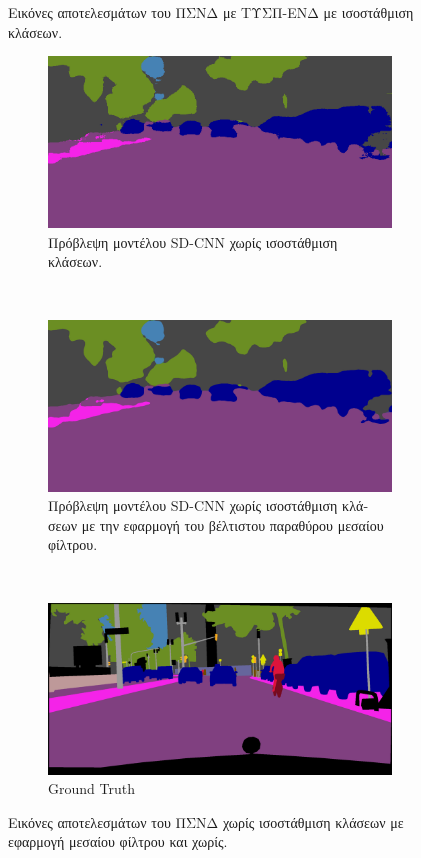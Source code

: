 \begin{figure}[H]
  \caption[\textgreek{Εικόνες από ΠΣΝΔ-ΤΥΣΠ-ΕΝΔ}]{\textgreek{Εικόνες αποτελεσμάτων του ΠΣΝΔ με ΤΥΣΠ-ΕΝΔ με ισοστάθμιση κλάσεων.}}
 \label{fig:image_results_1}
\end{figure}

\begin{figure}[H]
 \centering
 \begin{subfigure}[b]{\linewidth}
 \centering
 \includegraphics[width=0.8\linewidth]{Images/frankfurt_000000_015676_5_leftImg8bit}
  \caption{\textgreek{Πρόβλεψη μοντέλου }SD-CNN \textgreek{χωρίς ισοστάθμιση κλάσεων}.}
  \end{subfigure}
 ~
 \begin{subfigure}[b]{\linewidth}
 \centering
 \includegraphics[width=0.8\linewidth]{Images/frankfurt_000000_015676_5_median_leftImg8bit}
  \caption{\textgreek{Πρόβλεψη μοντέλου }SD-CNN \textgreek{χωρίς ισοστάθμιση κλάσεων με την εφαρμογή του βέλτιστου παραθύρου μεσαίου φίλτρου}.}
  \end{subfigure}
  ~
  \begin{subfigure}[b]{\linewidth}
  \centering
  \includegraphics[width=0.8\linewidth]{Images/frankfurt_000000_015676_gtFine_color}
  \caption{Ground Truth}
 \end{subfigure}
  \caption[\textgreek{Εικόνες από ΠΣΝΔ}]{\textgreek{Εικόνες αποτελεσμάτων του ΠΣΝΔ χωρίς ισοστάθμιση κλάσεων με εφαρμογή μεσαίου φίλτρου και χωρίς.}}
 \label{fig:image_results_2}
\end{figure}

